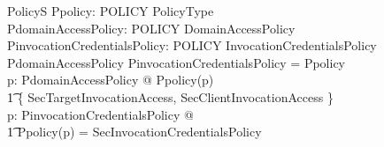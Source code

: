 \begin{schema}{PolicyS}
  Ppolicy: POLICY \pfun PolicyType \\
  PdomainAccessPolicy: POLICY \pfun DomainAccessPolicy \\
  PinvocationCredentialsPolicy: POLICY \pfun InvocationCredentialsPolicy \\
  \where
  \dom PdomainAccessPolicy \cup \dom PinvocationCredentialsPolicy 
  = \dom Ppolicy \\ 
  \forall p: \dom PdomainAccessPolicy @ Ppolicy(p) \in \\
  \t1 \{ SecTargetInvocationAccess, SecClientInvocationAccess \} \\
  \forall p: \dom PinvocationCredentialsPolicy @ \\
  \t1 Ppolicy(p) = SecInvocationCredentialsPolicy \\
\end{schema}


